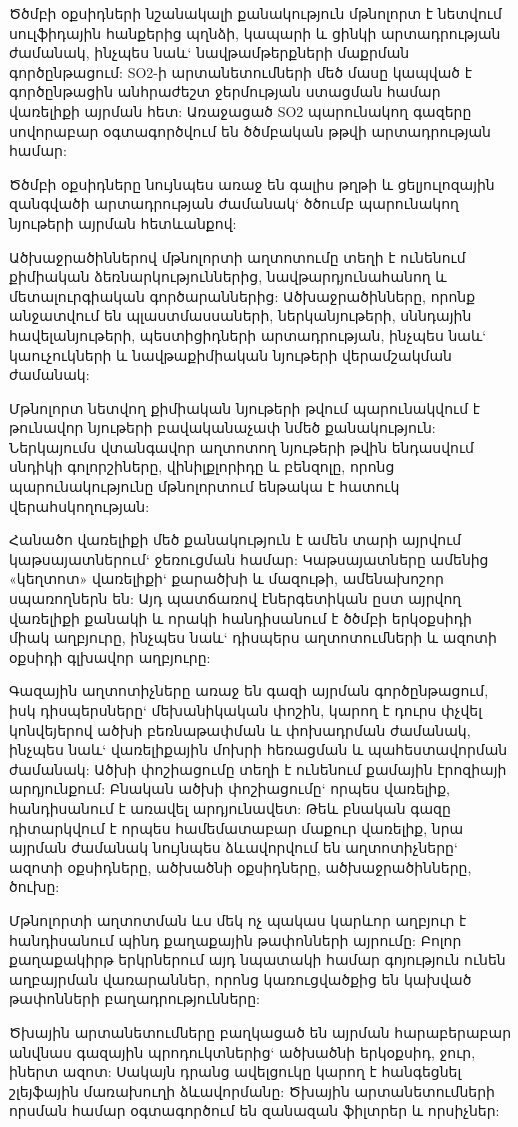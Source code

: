 \documentclass[12pt]{article}
\begin{document}
\begin{sloppypar}
Ծծմբի օքսիդների նշանակալի քանակություն մթնոլորտ է նետվում սուլֆիդային հանքերից պղնձի, կապարի և ցինկի արտադրության ժամանակ, ինչպես նաև` նավթամթերքների մաքրման գործընթացում: SO2-ի արտանետումների մեծ մասը կապված է գործընթացին անհրաժեշտ ջերմության ստացման համար վառելիքի այրման հետ: Առաջացած SO2 պարունակող գազերը սովորաբար օգտագործվում են ծծմբական թթվի արտադրության համար:

Ծծմբի օքսիդները նույնպես առաջ են գալիս թղթի և ցելյուլոզային զանգվածի արտադրության ժամանակ` ծծումբ պարունակող նյութերի այրման հետևանքով:

Ածխաջրածիններով մթնոլորտի աղտոտումը տեղի է ունենում քիմիական ձեռնարկություններից, նավթարդյունահանող և մետալուրգիական գործարաններից: Ածխաջրածինները, որոնք անջատվում են պլաստմասսաների, ներկանյութերի, սննդային հավելանյութերի, պեստիցիդների արտադրության, ինչպես նաև` կաուչուկների և նավթաքիմիական նյութերի վերամշակման ժամանակ:

Մթնոլորտ նետվող քիմիական նյութերի թվում պարունակվում է թունավոր նյութերի բավականաչափ նմեծ քանակություն: Ներկայումս վտանգավոր աղտոտող նյութերի թվին ենդասվում սնդիկի գոլորշիները, վինիլքլորիդը և բենզոլը, որոնց պարունակությունը մթնոլորտում ենթակա է հատուկ վերահսկողության:

Հանածո վառելիքի մեծ քանակություն է ամեն տարի այրվում կաթսայատներում` ջեռուցման համար: Կաթսայատները ամենից «կեղտոտ» վառելիքի` քարածխի և մազութի, ամենախոշոր սպառողներն են: Այդ պատճառով էներգետիկան ըստ այրվող վառելիքի քանակի և որակի հանդիսանում է ծծմբի երկօքսիդի միակ աղբյուրը, ինչպես նաև` դիսպերս աղտոտումների և ազոտի օքսիդի գլխավոր աղբյուրը:

Գազային աղտոտիչները առաջ են գազի այրման գործընթացում, իսկ դիսպերսները` մեխանիկական փոշին, կարող է դուրս փչվել կոնվեյերով ածխի բեռնաթափման և փոխադրման ժամանակ, ինչպես նաև` վառելիքային մոխրի հեռացման և պահեստավորման ժամանակ: Ածխի փոշիացումը տեղի է ունենում քամային էրոզիայի արդյունքում: Բնական ածխի փոշիացումը` որպես վառելիք, հանդիսանում է առավել արդյունավետ: Թեև բնական գազը դիտարկվում է որպես համեմատաբար մաքուր վառելիք, նրա այրման ժամանակ նույնպես ձևավորվում են աղտոտիչները` ազոտի օքսիդները, ածխածնի օքսիդները, ածխաջրածինները, ծուխը:

Մթնոլորտի աղտոտման ևս մեկ ոչ պակաս կարևոր աղբյուր է հանդիսանում պինդ քաղաքային թափոնների այրումը: Բոլոր քաղաքակիրթ երկրներում այդ նպատակի համար գոյություն ունեն աղբայրման վառարաններ, որոնց կառուցվածքից են կախված թափոնների բաղադրությունները:

Ծխային արտանետումները բաղկացած են այրման հարաբերաբար անվնաս գազային պրոդուկտներից` ածխածնի երկօքսիդ, ջուր, իներտ ազոտ: Սակայն դրանց ավելցուկը կարող է հանգեցնել շլեյֆային մառախուղի ձևավորմանը: Ծխային արտանետումների որսման համար օգտագործում են զանազան ֆիլտրեր և որսիչներ:


\end{sloppypar}
\end{document}
